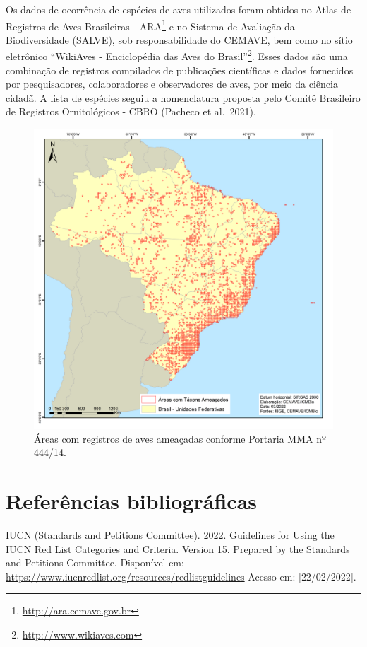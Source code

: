 \documentclass[
  oneside]{scrbook}
\DeclareRobustCommand{\href}[2]{#2\footnote{\url{#1}}}
\begin{document}
Os dados de ocorrência de espécies de aves utilizados foram obtidos no \href{http://ara.cemave.gov.br}{Atlas de Registros de Aves Brasileiras - ARA} e no Sistema de Avaliação da Biodiversidade (SALVE), sob responsabilidade do CEMAVE, bem como no sítio eletrônico \href{http://www.wikiaves.com}{``WikiAves - Enciclopédia das Aves do Brasil''}. Esses dados são uma combinação de registros compilados de publicações científicas e dados fornecidos por pesquisadores, colaboradores e observadores de aves, por meio da ciência cidadã. A lista de espécies seguiu a nomenclatura proposta pelo Comitê Brasileiro de Registros Ornitológicos - CBRO (Pacheco et al.~2021).

\begin{figure}[H]

{\centering \includegraphics[width=0.7\linewidth]{imagens/cap03/Figura_3.3} 

}

\caption{Áreas com registros de aves ameaçadas conforme Portaria MMA nº 444/14.}\label{fig:11}
\end{figure}

\newpage

\hypertarget{referuxeancias-bibliogruxe1ficas-2}{%
\section{Referências bibliográficas}\label{referuxeancias-bibliogruxe1ficas-2}}

IUCN (Standards and Petitions Committee). 2022. Guidelines for Using the IUCN Red List Categories and Criteria. Version 15. Prepared by the Standards and Petitions Committee. Disponível em: \url{https://www.iucnredlist.org/resources/redlistguidelines} Acesso em: {[}22/02/2022{]}.
\end{document}
